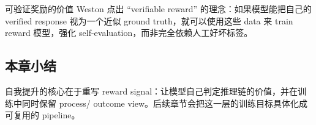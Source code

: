 \begin{knowledgebox}{可验证奖励的价值}
Weston 点出 ``verifiable reward'' 的理念：如果模型能把自己的 verified response 视为一个近似 ground truth，就可以使用这些 data 来 train reward 模型，强化 self-evaluation，而非完全依赖人工好坏标签。
\end{knowledgebox}

\subsection{本章小结}
自我提升的核心在于重写 reward signal：让模型自己判定推理链的价值，并在训练中同时保留 process/ outcome view。后续章节会把这一层的训练目标具体化成可复用的 pipeline。

